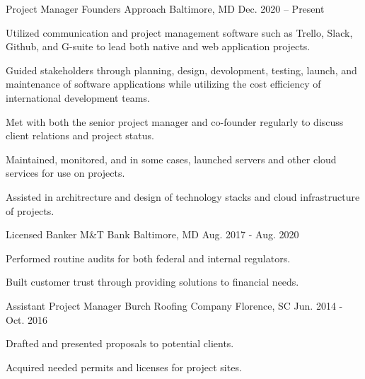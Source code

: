 

\begin{cventries}
\cventry
{Project Manager} %
{Founders Approach} %
{Baltimore, MD} %
{Dec. 2020 -- Present} %
{
      \begin{cvitems} 
        \item {Utilized communication and project management software such as Trello, Slack, Github, and G-suite to lead both native and web application projects.}
        \item {Guided stakeholders through planning, design, devolopment, testing, launch, and maintenance of software applications while utilizing the cost efficiency of international development teams.  }
        \item {Met with both the senior project manager and co-founder regularly to discuss client relations and project status.}
        \item {Maintained, monitored, and in some cases, launched servers and other cloud services for use on projects.}
        \item {Assisted in architrecture and design of technology stacks and cloud infrastructure of projects. }
      \end{cvitems}
    }

\cventry
{Licensed Banker} %
{M\&T Bank} %
{Baltimore, MD} %
{Aug. 2017 - Aug. 2020} %
{
  \begin{cvitems} %
    \item {Performed routine audits for both federal and internal regulators.}
    \item {Built customer trust through providing solutions to financial needs.}
  \end{cvitems}
}

\cventry
{Assistant Project Manager} %
{Burch Roofing Company} %
{Florence, SC} %
{Jun. 2014 - Oct. 2016} %
{
  \begin{cvitems} %
    \item {Drafted and presented proposals to potential clients.}
    \item {Acquired needed  permits and licenses for project sites.}
  \end{cvitems}
}

\end{cventries}